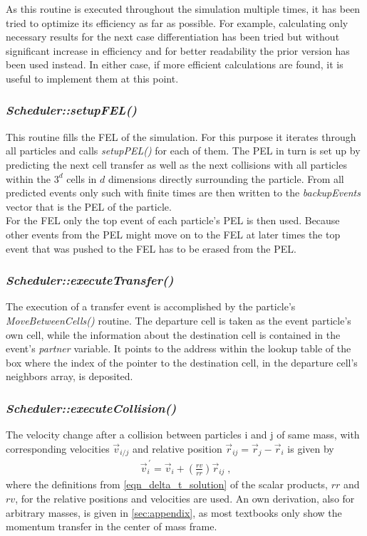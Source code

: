 As this routine is executed throughout the simulation multiple times, it has been tried to optimize its efficiency as far as possible. For example, calculating only necessary results for the next case differentiation has been tried but without significant increase in efficiency and for better readability the prior version has been used instead. In either case, if more efficient calculations are found, it is useful to implement them at this point. 

\subsubsection{\quad \textit{Scheduler::setupFEL()}}
This routine fills the FEL of the simulation. For this purpose it iterates through all particles and calls \textit{setupPEL()} for each of them. The PEL in turn is set up by predicting the next cell transfer as well as the next collisions with all particles within the $3^d$ cells in $d$ dimensions directly surrounding the particle. From all predicted events only such with finite times are then written to the \textit{backupEvents} vector that is the PEL of the particle.\\
For the FEL only the top event of each particle's PEL is then used. Because other events from the PEL might move on to the FEL at later times the top event that was pushed to the FEL has to be erased from the PEL.

\subsubsection{\quad \textit{Scheduler::executeTransfer()}}
The execution of a transfer event is accomplished by the particle's \textit{MoveBetweenCells()} routine. The departure cell is taken as the event particle's own cell, while the information about the destination cell is contained in the event's \textit{partner} variable. It points to the address within the lookup table of the box where the index of the pointer to the destination cell, in the departure cell's neighbors array, is deposited.

\subsubsection{\quad \textit{Scheduler::executeCollision()}}
The velocity change after a collision between particles i and j of same mass, with corresponding velocities $\vec{v}_{i/j}$ and relative position $\vec{r}_{ij} = \vec{r}_{j} -\vec{r}_{i}$ is given by   
\begin{align}
\label{eqn:collision_result}
\vec{v}_i^{\,'} = \vec{v}_i + \left( \frac{rv}{rr} \right) \vec{r}_{ij} \; \text{,}
\end{align}
where the definitions from \autoref{eqn_delta_t_solution} of the scalar products, $rr$ and $rv$, for the relative positions and velocities are used. An own derivation, also for arbitrary masses, is given in \autoref{sec:appendix}, as most textbooks only show the momentum transfer in the center of mass frame.
 
